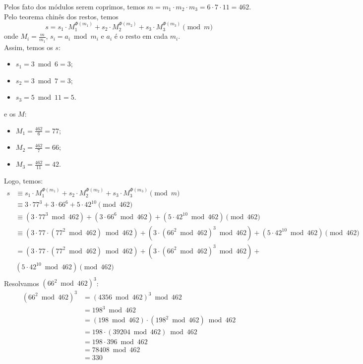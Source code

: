 Pelos fato dos módulos serem coprimos, temos $m = m_1 \cdot m_2 \cdot m_3 = 6 \cdot 7 \cdot 11 = 462$. \\
Pelo teorema chinês dos restos, temos 
\begin{displaymath}
	s = s_1 \cdot M_1^{\Phi(m_1)} + s_2 \cdot M_2^{\Phi(m_2)} + s_3 \cdot M_3^{\Phi(m_3)} \pmod{m}
\end{displaymath}
onde $M_i = \frac{m}{m_1}$, $s_i = a_i \bmod{m_i}$ e $a_i$ é o resto em cada $m_i$. \\ 
Assim, temos os $s$:
\begin{itemize}
	\item $s_1 = 3 \bmod{6} = 3$;
	\item $s_2 = 3 \bmod{7} = 3$;
	\item $s_3 = 5 \bmod{11} = 5$.
\end{itemize}
e os $M$:
\begin{itemize}
	\item $M_1 = \frac{462}{6} = 77$;
	\item $M_2 = \frac{462}{7} = 66$;
	\item $M_3 = \frac{462}{11} = 42$.
\end{itemize}
Logo, temos:
\begin{align*}
	s &\equiv s_1 \cdot M_1^{\Phi(m_1)} + s_2 \cdot M_2^{\Phi(m_2)} + s_3 \cdot M_3^{\Phi(m_3)} \pmod{m} \\
	&\equiv 3 \cdot 77^3 + 3 \cdot 66^6 + 5 \cdot 42^{10} \pmod{462} \\
	&\equiv (3 \cdot 77^3 \bmod{462}) + (3 \cdot 66^6 \bmod{462}) + (5 \cdot 42^{10} \bmod{462}) \pmod{462} \\
	&\equiv (3 \cdot 77 \cdot (77^2 \bmod{462}) \bmod{462}) + (3 \cdot (66^2 \bmod{462})^3 \bmod{462}) + (5 \cdot 42^{10} \bmod{462}) \pmod{462} \\
	&= (3 \cdot 77 \cdot (77^2 \bmod{462}) \bmod{462}) + (3 \cdot (66^2 \bmod{462})^3 \bmod{462}) + \\& (5 \cdot 42^{10} \bmod{462}) \pmod{462} \\
\end{align*}
Resolvamos $(66^2 \bmod{462})^3$:
\begin{align*}
	(66^2 \bmod{462})^3 &= (4356 \bmod{462})^3 \bmod{462} \\
	&= 198^3 \bmod{462} \\
	&= (198 \bmod{462}) \cdot (198^2 \bmod{462}) \bmod{462} \\
	&= 198 \cdot (39204 \bmod{462}) \bmod{462} \\
	&= 198 \cdot 396 \bmod{462} \\
	&= 78408 \bmod{462} \\
	&= 330 \\
\end{align*}
